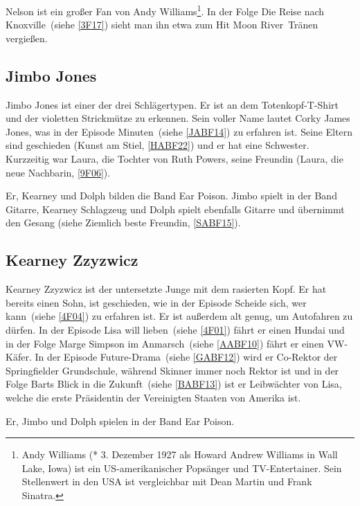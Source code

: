 Nelson ist ein großer Fan von Andy Williams\footnote{Andy Williams (* 3. Dezember 1927 als Howard Andrew Williams in Wall Lake, Iowa) ist ein US-amerikanischer Popsänger und TV-Entertainer. Sein Stellenwert in den USA ist vergleichbar mit Dean Martin und Frank Sinatra.}. In der Folge \glqq Die Reise nach Knoxville\grqq\ (siehe \ref{3F17}) sieht man ihn etwa zum Hit \glqq Moon River\grqq\ Tränen vergießen.


\subsection{Jimbo Jones}\label{JimboJones}
Jimbo Jones ist einer der drei Schlägertypen. Er ist an dem Totenkopf-T-Shirt und der violetten Strickmütze zu erkennen. Sein voller Name lautet Corky James Jones, was in der Episode  Minuten\grqq\ (siehe \ref{JABF14}) zu erfahren ist. Seine Eltern sind geschieden (\glqq Kunst am Stiel\grqq , \ref{HABF22}) und er hat eine Schwester. Kurzzeitig war Laura, die Tochter von Ruth Powers, seine Freundin (\glqq Laura, die neue Nachbarin\grqq , \ref{9F06}).

Er, Kearney und Dolph bilden die Band \glqq Ear Poison\grqq . Jimbo spielt in der Band Gitarre, Kearney Schlagzeug und Dolph spielt ebenfalls Gitarre und übernimmt den Gesang (siehe \glqq Ziemlich beste Freundin\grqq , \ref{SABF15}).


\subsection{Kearney Zzyzwicz}\label{KearneyZzyzwicz}
Kearney Zzyzwicz ist der untersetzte Junge mit dem rasierten Kopf. Er hat bereits einen Sohn, ist geschieden, wie in der Episode \glqq Scheide sich, wer kann\grqq\ (siehe \ref{4F04}) zu erfahren ist. Er ist außerdem alt genug, um Autofahren zu dürfen. In der Episode \glqq Lisa will lieben\grqq\ (siehe \ref{4F01}) fährt er einen Hundai und in der Folge \glqq Marge Simpson im Anmarsch\grqq\ (siehe \ref{AABF10}) fährt er einen VW-Käfer. In der Episode \glqq Future-Drama\grqq\ (siehe \ref{GABF12}) wird er Co-Rektor der Springfielder Grundschule, während Skinner immer noch Rektor ist und in der Folge \glqq Barts Blick in die Zukunft\grqq\ (siehe \ref{BABF13}) ist er Leibwächter von Lisa, welche die erste Präsidentin der Vereinigten Staaten von Amerika ist.

Er, Jimbo und Dolph spielen in der Band \glqq Ear Poison\grqq .

